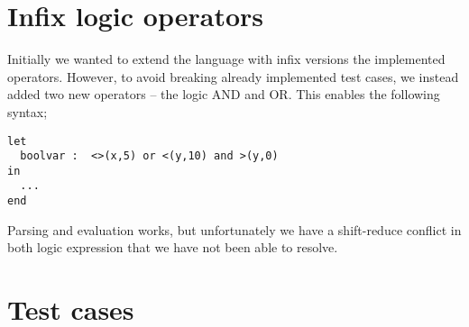 \documentclass[10pt]{scrartcl}
\begin{document}
\section{Infix logic operators}
Initially we wanted to extend the language with infix versions the implemented operators. However, to avoid breaking already implemented test cases, we instead added two new operators -- the logic AND and OR. This enables the following syntax;
\begin{lstlisting}
let
  boolvar :  <>(x,5) or <(y,10) and >(y,0)
in
  ...
end
\end{lstlisting}
Parsing and evaluation works, but unfortunately we have a shift-reduce conflict in both logic expression that we have not been able to resolve.
\section{Test cases}
\end{document}
